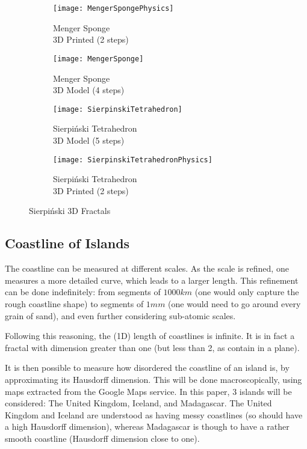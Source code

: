 \begin{figure}[!h]
	\centering
	\begin{subfigure}{.24\textwidth}
		\texttt{[image: MengerSpongePhysics]}
		\centering
		\captionsetup{justification=centering}
		\caption{Menger Sponge\\ 3D Printed (2 steps)}
		\label{fig:MengerSponge3Dprinted}
	\end{subfigure}
	\begin{subfigure}{.24\textwidth}
		\texttt{[image: MengerSponge]}
		\centering
		\captionsetup{justification=centering}
		\caption{Menger Sponge\\ 3D Model (4 steps)}
		\label{fig:MengerSponge}
	\end{subfigure}
	\begin{subfigure}{.24\textwidth}
		\texttt{[image: SierpinskiTetrahedron]}
		\centering
		\captionsetup{justification=centering}
		\caption{Sierpiński Tetrahedron\\ 3D Model (5 steps)}
		\label{fig:SierpinskiTetrahedron}
	\end{subfigure}
	\begin{subfigure}{.24\textwidth}
		\texttt{[image: SierpinskiTetrahedronPhysics]}
		\centering
		\captionsetup{justification=centering}
		\caption{Sierpiński Tetrahedron\\ 3D Printed (2 steps)}
		\label{fig:SierpinskiTetrahedron3Dprinted}
	\end{subfigure}
	\caption{Sierpiński 3D Fractals}
	\label{fig:Sierpinski3D}
\end{figure}

\subsection{Coastline of Islands}\label{appendix:coastlines}
The coastline can be measured at different scales.
As the scale is refined, one measures a more detailed curve, which leads to a larger length.
This refinement can be done indefinitely: from segments of $1000km$ (one would only capture the rough coastline shape) to segments of $1mm$ (one would need to go around every grain of sand), and even further considering sub-atomic scales.

Following this reasoning, the (1D) length of coastlines is infinite.
It is in fact a fractal with dimension greater than one (but less than 2, as contain in a plane).

It is then possible to measure how disordered the coastline of an island is, by approximating its Hausdorff dimension.
This will be done macroscopically, using maps extracted from the Google Maps service.
In this paper, 3 islands will be considered: The United Kingdom, Iceland, and Madagascar.
The United Kingdom and Iceland are understood as having messy coastlines (so should have a high Hausdorff dimension), whereas Madagascar is though to have a rather smooth coastline (Hausdorff dimension close to one).

